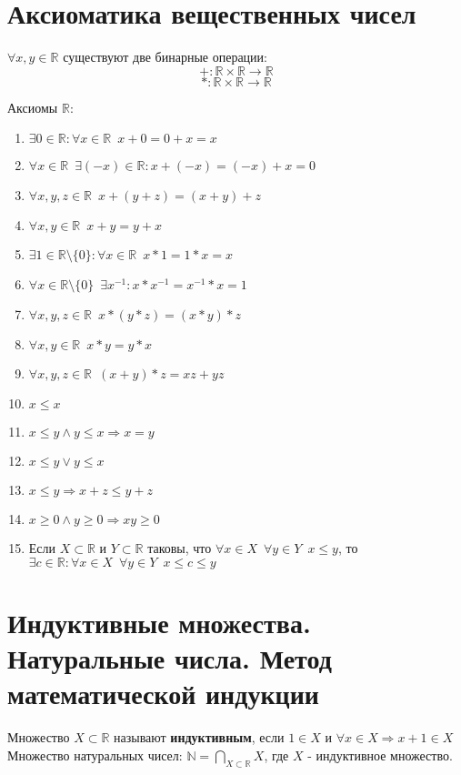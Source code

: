 \documentclass[11pt, a4paper]{article}
\def\R{\mathbb{R}}
\def\N{\mathbb{N}}
\def\sp{\, \, \,}
\begin{document}
    \tableofcontents \pagebreak
    \noindent


    \section{Аксиоматика вещественных чисел}
    $\forall x,y \in \R$ существуют две бинарные операции:
    $$+: \R \times \R \to \R$$
    $$*: \R \times \R \to \R$$

    Аксиомы $\R$:
    \begin{enumerate}
        \item $\exists 0 \in \R : \forall x \in \R \sp x + 0 = 0 + x = x$
        \item $\forall x \in \R \sp \exists (-x) \in \R: x + (-x) = (-x) + x = 0$
        \item $\forall x,y,z \in \R \sp x+(y+z)=(x+y)+z$
        \item $\forall x,y \in \R \sp x+y = y+x$
        \item $\exists 1 \in \R \setminus \{0\}: \forall x \in \R \sp x*1 = 1*x = x$
        \item $\forall x \in \R \setminus \{0\} \sp \exists x^{-1}: x*x^{-1} = x^{-1}*x = 1$
        \item $\forall x,y,z \in \R \sp x*(y*z)=(x*y)*z$
        \item $\forall x,y \in \R \sp x*y = y*x$
        \item $\forall x,y,z \in \R \sp (x+y)*z=xz + yz$
        \item $x \leq x$
        \item $x \leq y \land y \leq x \Rightarrow x = y$
        \item $x \leq y \lor y \leq x$
        \item $x \leq y \Rightarrow x+z \leq y+z$
        \item $x \geq 0 \land y \geq 0 \Rightarrow xy \geq 0$
        \item Если $X \subset \R$ и $Y \subset \R$ таковы, что $\forall x \in X \sp \forall y \in Y \sp x \leq y$, то $\exists c \in \R: \forall x \in X \sp \forall y \in Y \sp x \leq c \leq y$
    \end{enumerate}

    \section{Индуктивные множества. Натуральные числа. Метод математической индукции}
    Множество $X \subset \R$ называют \textbf{индуктивным}, если $1 \in X$ и $\forall x \in X \Rightarrow x+1 \in X$\\
    Множество натуральных чисел: $\displaystyle \N = \bigcap_{X \subset \R} X$, где $X$ - индуктивное множество.
    
\end{document}
